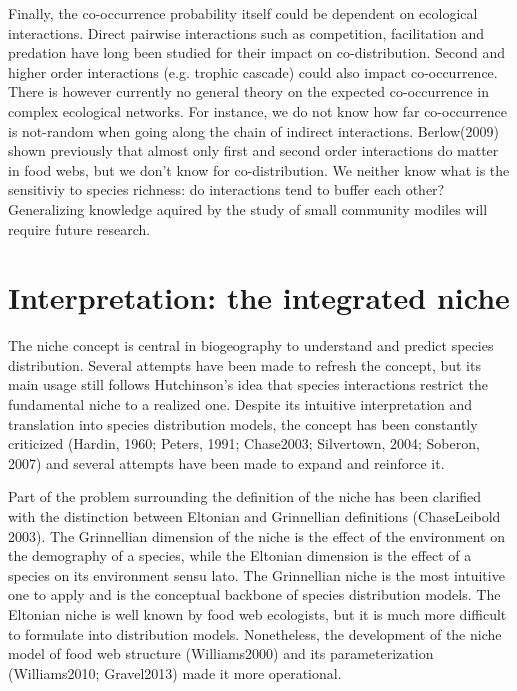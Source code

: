 \documentclass[12pt]{article}
\begin{document}
Finally, the co-occurrence probability itself could be dependent on ecological
interactions. Direct pairwise interactions such as competition, facilitation and
predation have long been studied for their impact on co-distribution. Second and
higher order interactions (e.g. trophic cascade) could also impact
co-occurrence. There is however currently no general theory on the expected
co-occurrence in complex ecological networks. For instance, we do not know how
far co-occurrence is not-random when going along the chain of indirect
interactions. Berlow(2009) shown previously that almost only first and second
order interactions do matter in food webs, but we don't know for
co-distribution. We neither know what is the sensitiviy to species richness: do
interactions tend to buffer each other? Generalizing knowledge aquired by the
study of small community modiles will require future research.

\newpage
\section*{Interpretation: the integrated niche}

The niche concept is central in biogeography to understand and predict species
distribution. Several attempts have been made to refresh the concept, but its
main usage still follows Hutchinson’s idea that species interactions restrict
the fundamental niche to a realized one. Despite its intuitive
interpretation and translation into species distribution models, the 
concept has been constantly criticized (Hardin, 1960; Peters, 1991;
Chase2003; Silvertown, 2004; Soberon, 2007) and several attempts have
been made to expand and reinforce it. 

Part of the problem surrounding the definition of the niche has been clarified
with the distinction between Eltonian and Grinnellian definitions (ChaseLeibold
2003). The Grinnellian dimension of the niche is the effect of the environment
on the demography of a species, while the Eltonian dimension is the effect of a
species on its environment sensu lato. The Grinnellian niche is the most
intuitive one to apply and is the conceptual backbone of species distribution
models. The Eltonian niche is well known by food web ecologists, but it is much
more difficult to formulate into distribution models. Nonetheless, the
development of the niche model of food web structure (Williams2000) and its parameterization (Williams2010; Gravel2013) made
it more operational.
\end{document}
